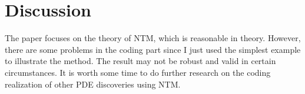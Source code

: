 \documentclass[12pt]{article}
\begin{document}
\section{Discussion}
\label{sec:disc}
The paper focuses on the theory of NTM, which is reasonable in theory. However, there are some problems in the coding part since I just used the simplest example to illustrate the method. The result may not be robust and valid in certain circumstances. It is worth some time to do further research on the coding realization of other PDE discoveries using NTM. 





\end{document}
